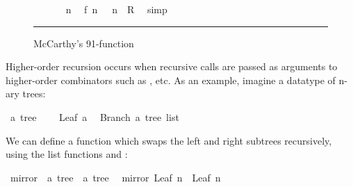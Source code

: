 \begin{isabellebody}
\begin{figure}
\begin{minipage}{0.8\textwidth}
\isanewline
\ \ \isamarkupfalse%
\ {}{}\ {}{}{}\ {}\ n{}\ \isamarkupfalse%
\ {}{}f{}{}\ {}n\ {}\ {}{}{}{}\ n{}\ {}\ {}R{}\ \isamarkupfalse%
\ simp\isanewline
{}\isamarkupfalse%
%
\endisatagproof
{\isafoldproof}%
%
\isadelimproof
%
\endisadelimproof
%
\isamarkupfalse{}
\end{minipage}
\vspace{6pt}\hrule
\caption{McCarthy's 91-function}\label{f91}
\end{figure}
%
\isamarkuptrue%
%
\begin{isamarkuptext}%
Higher-order recursion occurs when recursive calls
  are passed as arguments to higher-order combinators such as ,  etc.
  As an example, imagine a datatype of n-ary trees:%
\end{isamarkuptext}%
\isamarkuptrue%
\isamarkupfalse%
\ {}a\ tree\ {}\ \isanewline
\ \ Leaf\ {}a\ \isanewline
{}\ Branch\ {}{}a\ tree\ list{}%
\begin{isamarkuptext}%
\noindent We can define a function which swaps the left and right subtrees recursively, using the 
  list functions  and :%
\end{isamarkuptext}%
\isamarkuptrue%
\isamarkupfalse%
\ mirror\ {}{}\ {}{}a\ tree\ {}\ {}a\ tree{}\isanewline
{}\isanewline
\ \ {}mirror\ {}Leaf\ n{}\ {}\ Leaf\ n{}\isanewline

\end{isabellebody}
